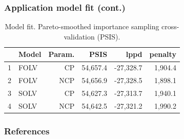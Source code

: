 \documentclass[arial,12pt,xcolor=dvipsnames]{beamer}
\begin{document}
\begin{frame}
	\frametitle{Application model fit (cont.)}
	\begin{table}[H]
		\centering
		\begin{tabular}{rlrrrr}
			\hline
			& Model & Param. & PSIS & lppd & penalty \\  
			\hline\hline
			1 & FOLV & CP &  54,657.4 & -27,328.7 & 1,904.4 \\ 
			2 & FOLV & NCP & 54,656.9 & -27,328.5 & 1,898.1  \\
			\hline
			3 & SOLV & CP &  54,627.3 & -27,313.7 & 1,940.1 \\  
			4 & SOLV & NCP & 54,642.5 & -27,321.2 & 1,990.2 \\ 
			\hline
		\end{tabular}
		\caption[Model fit. Pareto-smoothed importance sampling cross-validation (PSIS).]%
		{Model fit. Pareto-smoothed importance sampling cross-validation (PSIS).}
		\label{tab:model_fit2}
	\end{table} 
\end{frame}
%
%
%
\begin{frame}[allowframebreaks]
\frametitle{References}
%


%
\end{frame}
%
%
\end{document}
